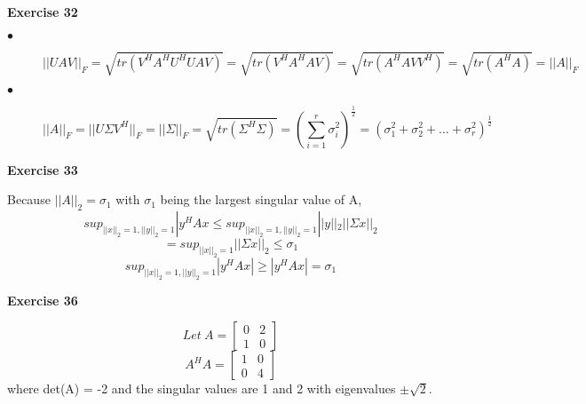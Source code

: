 \documentclass[letterpaper,12pt]{article}
\theoremstyle{definition}
\begin{document}
\noindent\textbf{Exercise 32} 
\begin{description}
\item[$\bullet$] \[||UAV||_F = \sqrt{tr(V^HA^HU^HUAV)} = \sqrt{tr(V^HA^HAV)} = \sqrt{tr(A^HAVV^H)} = \sqrt{tr(A^HA)} = ||A||_F\]
\item[$\bullet$] \[||A||_F = ||U\Sigma V^H||_F = ||\Sigma ||_F = \sqrt{tr(\Sigma ^H\Sigma)} = (\sum_{i=1}^r \sigma_i^2)^{\frac{1}{2}} = (\sigma_1^2 + \sigma_2^2 + \dots + \sigma_r^2)^{\frac{1}{2}}\]
\end{description}

\noindent\textbf{Exercise 33} 
\begin{description}
\item Because $||A||_2 = \sigma_1$ with $\sigma_1$ being the largest singular value of A, 
\[sup_{||x||_2 = 1, ||y||_2 = 1} |y^HAx \leq sup_{||x||_2 = 1, ||y||_2 = 1} ||y||_2 ||\Sigma x||_2\]
\[= sup_{||x||_2 = 1} ||\Sigma x||_2 \leq \sigma_1\]
\[sup_{||x||_2 = 1, ||y||_2 = 1} |y^HAx| \geq |y^HAx| = \sigma_1\]
\end{description}

\noindent\textbf{Exercise 36} 
\begin{description}
\item 
\[Let \ A = 
  \begin{bmatrix}
   0 & 2  \\
   1 & 0
\end{bmatrix}
\]
\[A^HA = 
  \begin{bmatrix}
   1 & 0  \\
   0 & 4
\end{bmatrix}
\]
where det(A) = -2 and the singular values are 1 and 2 with eigenvalues $\pm \sqrt{2}$.
\end{description}
\end{document}
